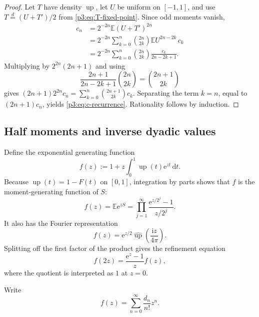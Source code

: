 \documentclass[11pt]{article}
\numberwithin{equation}{section}
\theoremstyle{definition}
\theoremstyle{remark}
\newcommand{\upf}{\operatorname{up}}
\newcommand{\dd}{\,\mathrm d}
\newcommand{\e}{\mathrm e}
\newcommand{\ii}{\mathrm i}
\begin{document}
\begin{proof}
Let $T$ have density $\upf$, let $U$ be uniform on $[-1,1]$, and use
$T\stackrel d=(U+T')/2$ from \eqref{p3:eq:T-fixed-point}.  Since odd moments vanish,
\begin{align*}
 c_n
 &=2^{-2n}\mathbb E(U+T')^{2n}\\
 &=2^{-2n}\sum_{k=0}^{n}\binom{2n}{2k}
       \mathbb E U^{2n-2k}\,c_k\\
 &=2^{-2n}\sum_{k=0}^{n}\binom{2n}{2k}
       \frac{c_k}{2n-2k+1}.
\end{align*}
Multiplying by $2^{2n}(2n+1)$ and using
\[
 \frac{2n+1}{2n-2k+1}\binom{2n}{2k}=\binom{2n+1}{2k}
\]
gives
$(2n+1)2^{2n}c_n=\sum_{k=0}^{n}\binom{2n+1}{2k}c_k$.
Separating the term $k=n$, equal to $(2n+1)c_n$, yields \eqref{p3:eq:c-recurrence}.  Rationality follows by induction.
\end{proof}

\subsection{Half moments and inverse dyadic values}

Define the exponential generating function
\begin{equation}\label{p3:eq:f-generating}
 f(z):=1+z\int_0^1\upf(t)\e^{zt}\dd t.
\end{equation}
Because $\upf(t)=1-F(t)$ on $[0,1]$, integration by parts shows that $f$ is the moment-generating function of $S$:
\begin{equation}\label{p3:eq:f-mgf}
 f(z)=\mathbb E\e^{zS}
     =\prod_{j=1}^{\infty}\frac{\e^{z/2^j}-1}{z/2^j}.
\end{equation}
It also has the Fourier representation
\begin{equation}\label{p3:eq:f-Fourier}
 f(z)=\e^{z/2}\widehat{\upf}\!\left(\frac{\ii z}{4\pi}\right).
\end{equation}
Splitting off the first factor of the product gives the refinement equation
\begin{equation}\label{p3:eq:f-refinement}
 f(2z)=\frac{\e^z-1}{z}f(z),
\end{equation}
where the quotient is interpreted as $1$ at $z=0$.

Write
\begin{equation}\label{p3:eq:d-generating}
 f(z)=\sum_{n=0}^{\infty}\frac{d_n}{n!}z^n.
\end{equation}
\end{document}
